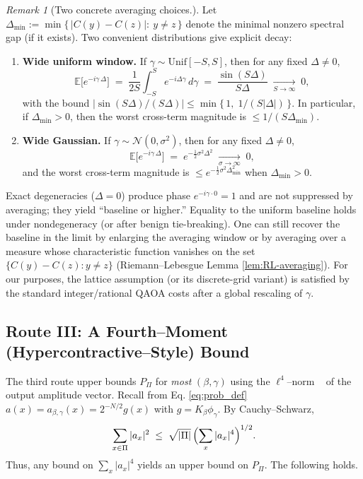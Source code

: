 \documentclass[a4paper,onecolumn,11pt,unpublished]{quantumarticle}
\theoremstyle{remark}
\newtheorem{remark}[theorem]{Remark}
\begin{document}
\begin{remark}[Two concrete averaging choices.]
\label{rem:RL-examples}
Let $\Delta_{\min}:=\min\{\,|C(y)-C(z)|:\ y\neq z\,\}$ denote the minimal nonzero spectral gap
(if it exists). Two convenient distributions give explicit decay:
\begin{enumerate}
  \item \textbf{Wide uniform window.} If $\gamma\sim \mathrm{Unif}[-S,S]$, then for any fixed $\Delta\neq 0$,
  \[
    \mathbb{E}\big[e^{-i\gamma\,\Delta}\big]
      \;=\; \frac{1}{2S}\!\int_{-S}^{S} e^{-i\Delta \gamma}\,d\gamma
      \;=\; \frac{\sin(S\Delta)}{S\Delta}
      \;\xrightarrow[S\to\infty]{}\; 0,
  \]
  with the bound $\big|\sin(S\Delta)/(S\Delta)\big|\le \min\{\,1,\;1/(S|\Delta|)\,\}$.
  In particular, if $\Delta_{\min}>0$, then the worst cross-term magnitude is $\le 1/(S\Delta_{\min})$.

  \item \textbf{Wide Gaussian.} If $\gamma\sim \mathcal N(0,\sigma^2)$, then for any fixed $\Delta\neq 0$,
  \[
    \mathbb{E}\big[e^{-i\gamma\,\Delta}\big]
      \;=\; e^{-\tfrac{1}{2}\sigma^2\Delta^2}
      \;\xrightarrow[\sigma\to\infty]{}\; 0,
  \]
  and the worst cross-term magnitude is $\le e^{-\tfrac{1}{2}\sigma^2\Delta_{\min}^2}$ when $\Delta_{\min}>0$.
  \end{enumerate}
Exact degeneracies ($\Delta=0$) produce phase $e^{-i\gamma\cdot 0}=1$ and are not suppressed by averaging; they yield ``baseline or higher.'' Equality to the uniform baseline holds under nondegeneracy (or after benign tie-breaking). One can still recover the baseline in the limit by enlarging the averaging window or by averaging over a measure whose characteristic function vanishes on the set
$\{C(y)-C(z):y\ne z\}$ (Riemann–Lebesgue Lemma \ref{lem:RL-averaging}). For our purposes, the lattice assumption
(or its discrete-grid variant) is satisfied by the standard integer/rational
QAOA costs after a global rescaling of $\gamma$.
\end{remark}



\subsection{Route III: A Fourth–Moment (Hypercontractive–Style) Bound}
\label{app:L4}

The third route upper bounds $P_{\Pi}$ for \emph{most} $(\beta,\gamma)$ using the $\ell^4$–norm ~\cite{ODonnell2014} of the output amplitude vector. Recall 
from Eq. \ref{eq:prob_def} $a(x)=a_{\beta,\gamma}(x)=2^{-N/2}g(x)$ with  $g=K_\beta\phi_\gamma$. By Cauchy–Schwarz,
\begin{equation}
  \sum_{x\in\Pi} |a_x|^2 \;\le\; \sqrt{|\Pi|}\,\Bigl(\sum_{x}|a_x|^4\Bigr)^{1/2}.
  \label{eq:CS-L4}
\end{equation}
Thus, any bound on $\sum_x |a_x|^4$ yields an upper bound on $P_{\Pi}$. The following holds.
\end{document}
